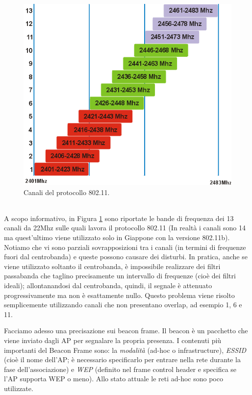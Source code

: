 \begin{figure}[htbp]
	\centering
	\includegraphics[scale = 0.4]{images/802_11-channels}
	\caption{Canali del protocollo 802.11.}
	\label{img:802_11-channels}
\end{figure}\\
A scopo informativo, in Figura \ref{img:802_11-channels} sono riportate le bande di frequenza dei 13 canali da 22Mhz sulle quali lavora il protocollo 802.11 (In realtà i canali sono 14 ma quest'ultimo viene utilizzato solo in Giappone con la versione 802.11b). Notiamo che vi sono parziali sovrapposizioni tra i canali (in termini di frequenze fuori dal centrobanda) e queste possono causare dei disturbi. In pratica, anche se viene utilizzato soltanto il centrobanda, è impossibile realizzare dei filtri passabanda che taglino precisamente un intervallo di frequenze (cioè dei filtri ideali); allontanandosi dal centrobanda, quindi, il segnale è attenuato progressivamente ma non è esattamente nullo. Questo problema viene risolto semplicemente utilizzando canali che non presentano overlap, ad esempio 1, 6 e 11.

Facciamo adesso una precisazione sui beacon frame. Il beacon è un pacchetto che viene inviato dagli AP per segnalare la propria presenza. I contenuti più importanti del Beacon Frame sono: la \textit{modalità} (ad-hoc o infrastructure), \textit{ESSID} (cioè il nome dell'AP; è necessario specificarlo per entrare nella rete durante la fase dell'associazione) e \textit{WEP} (definito nel frame control header e specifica se l'AP supporta WEP o meno). Allo stato attuale le reti ad-hoc sono poco utilizzate.


